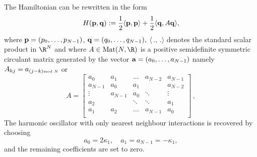 The  Hamiltonian  can be rewritten in the form
			\begin{equation}
	\label{GKMM21:eq:A}
	H({\bf{p}},{\bf{q}}) := \frac{1}{2} \langle{\bf{p}}, {\bf{p}}\rangle +\frac{1}{2}\langle {\bf{q}},A {\bf{q}}\rangle,
	\end{equation}
	where ${\bf{p}}=(p_0,\dots,p_{N-1}) $, ${\bf{q}}=(q_0,\dots,q_{N-1}),$  $\langle\,.,\,.\rangle$ denotes the standard scalar product in $\R^N$ and
	where $A\in\mbox{Mat}(N,\R)$ is a positive semidefinite  symmetric   circulant matrix generated by the vector  ${\bf{a}}=(a_0,\dots,a_{N-1})$ namely $A_{kj}=a_{(j-k)\mbox{\tiny {mod $N$}}}$ or
	\begin{equation}
	\label{GKMM21:A}
			A = {\begin{bmatrix}
				a_{0}&  a_{1}&\dots & a_{N-2}& a_{N-1}
				\\
				a_{N-1}& a_{0}& a_{1}&& a_{N-2}
				\\
				\vdots & a_{N-1}& a_{0}&\ddots &\vdots
				\\
				a_{2}&&\ddots &\ddots & a_{1}
				\\
				a_{1}& a_{2}&\dots & a_{N-1}& a_{0}
				\\
				\end{bmatrix}}\, ,
		\end{equation}
The harmonic oscillator with  only  nearest neighbour interactions  is recovered by choosing
\[
a_0=2\kappa_1,\quad a_1=a_{N-1}=-\kappa_1,
\]
and the remaining coefficients  are set to zero.

